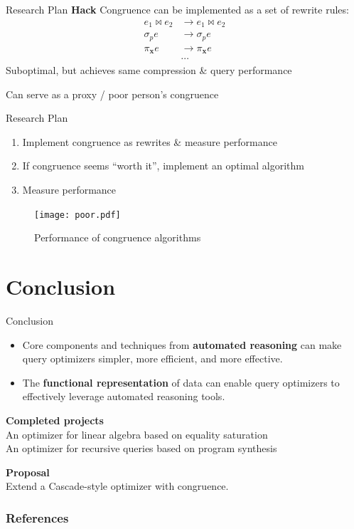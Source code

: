 \documentclass{beamer}
\begin{document}
  \begin{frame}{Research Plan}
    \textbf{Hack} Congruence can be implemented as a set of rewrite rules:
    \begin{align*}
      e_1 \bowtie e_2 & \rightarrow e_1 \bowtie e_2 \\
      \sigma_p e & \rightarrow \sigma_p e \\
      \pi_{\mathbf{x}} e & \rightarrow \pi_{\mathbf{x}} e \\
      & \cdots
    \end{align*} \pause
    Suboptimal, but achieves same compression \& query performance \pause
    
    Can serve as a proxy / poor person's congruence
  \end{frame}

  \begin{frame}{Research Plan}
    \begin{enumerate}
      \item Implement congruence as rewrites \& measure performance
      \item If congruence seems ``worth it'', implement an optimal algorithm
      \item Measure performance
    \end{enumerate} \pause
    \begin{figure}
      \texttt{[image: poor.pdf]}
      \caption*{Performance of congruence algorithms}
    \end{figure}
  \end{frame}

  \section{Conclusion}

  \begin{frame}{Conclusion}
    \begin{itemize}
      \item Core components and techniques from \textbf{automated reasoning}
      can make query optimizers simpler, more efficient,
      and more effective. 
      \item The \textbf{functional representation} of data can enable query 
      optimizers to effectively leverage automated reasoning tools.
    \end{itemize}
    \textbf{Completed projects} \\
    An optimizer for linear algebra based on equality saturation\\
    An optimizer for recursive queries based on program synthesis

    \textbf{Proposal} \\
    Extend a Cascade-style optimizer with congruence.
  \end{frame}

  \begin{frame}[allowframebreaks]
    \frametitle{References}
    
    
  \end{frame}

  
\end{document}
